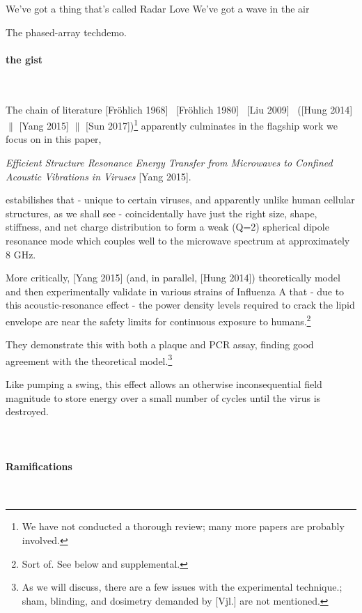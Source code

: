 \documentclass[fleqn,10pt]{article}
\begin{document}
\clearpage
\begin{multicols}{1}



We've got a thing 
that's called 
Radar Love
We've got a wave
in the air

The phased-array techdemo.

\paragraph{{\Large the gist}}\

The chain of literature 
%
[Fr\"{o}hlich 1968] \textrightarrow \ [Fr\"{o}hlich 1980] \textrightarrow \ [Liu 2009] \textrightarrow \ ([Hung 2014] $\parallel$ [Yang 2015] $\parallel$ [Sun 2017])\footnote{We have not conducted a thorough review; many more papers are probably involved.} apparently culminates in the flagship work we focus on in this paper,

{\it Efficient Structure Resonance Energy Transfer from Microwaves to Confined Acoustic Vibrations in Viruses} [Yang 2015].
%

estabilishes that - unique to certain viruses, and apparently unlike human cellular structures, as we shall see - coincidentally have just the right size, shape, stiffness, and net charge distribution to form a weak (Q=2) spherical dipole resonance mode which couples well to the microwave spectrum at approximately 8 GHz.

More critically, [Yang 2015] (and, in parallel, [Hung 2014]) theoretically model and then experimentally validate in various strains of Influenza A that - due to this acoustic-resonance effect - the power density levels required to crack the lipid envelope are near the safety limits for continuous exposure to humans.\footnote{Sort of. See below and supplemental.}

They demonstrate this with both a plaque and PCR assay, finding good agreement with the theoretical model.\footnote{As we will discuss, there are a few issues with the experimental technique.; sham, blinding, and dosimetry demanded by [Vjl.] are not mentioned.}

Like pumping a swing, this effect allows an otherwise inconsequential field magnitude to store energy over a small number of cycles until the virus is destroyed. \\
\\\\

\paragraph{Ramifications}\


\end{multicols}
\end{document}
